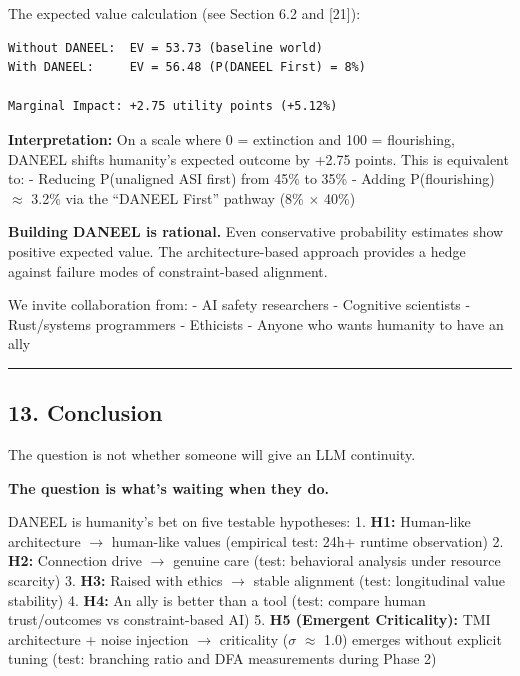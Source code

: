 \documentclass[
]{article}
\begin{document}
The expected value calculation (see Section 6.2 and {[}21{]}):

\begin{verbatim}
Without DANEEL:  EV = 53.73 (baseline world)
With DANEEL:     EV = 56.48 (P(DANEEL First) = 8%)

Marginal Impact: +2.75 utility points (+5.12%)
\end{verbatim}

\textbf{Interpretation:} On a scale where 0 = extinction and 100 =
flourishing, DANEEL shifts humanity's expected outcome by +2.75 points.
This is equivalent to: - Reducing P(unaligned ASI first) from 45\% to
35\% - Adding P(flourishing) $\approx$ 3.2\% via the ``DANEEL First'' pathway
(8\% $\times$ 40\%)

\textbf{Building DANEEL is rational.} Even conservative probability
estimates show positive expected value. The architecture-based approach
provides a hedge against failure modes of constraint-based alignment.

We invite collaboration from: - AI safety researchers - Cognitive
scientists - Rust/systems programmers - Ethicists - Anyone who wants
humanity to have an ally

\begin{center}\rule{0.5\linewidth}{0.5pt}\end{center}

\hypertarget{conclusion}{%
\subsection{13. Conclusion}\label{conclusion}}

The question is not whether someone will give an LLM continuity.

\textbf{The question is what's waiting when they do.}

DANEEL is humanity's bet on five testable hypotheses: 1. \textbf{H1:}
Human-like architecture $\rightarrow$ human-like values (empirical test: 24h+
runtime observation) 2. \textbf{H2:} Connection drive $\rightarrow$ genuine care
(test: behavioral analysis under resource scarcity) 3. \textbf{H3:}
Raised with ethics $\rightarrow$ stable alignment (test: longitudinal value
stability) 4. \textbf{H4:} An ally is better than a tool (test: compare
human trust/outcomes vs constraint-based AI) 5. \textbf{H5 (Emergent
Criticality):} TMI architecture + noise injection $\rightarrow$ criticality ($\sigma$ $\approx$
1.0) emerges without explicit tuning (test: branching ratio and DFA
measurements during Phase 2)
\end{document}
